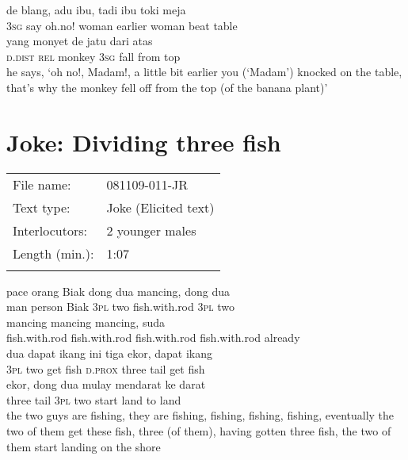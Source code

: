 \ea
\gll   de    {blang,}    {adu}    {ibu,}    {tadi}    {ibu}   toki   meja\\
  \textsc{3sg}    {say}    {oh.no!}    {woman}    {earlier}    {woman}   beat   table\\
    {yang}    {monyet}   de    {jatu}    {dari}    {atas}\\
   {\textsc{d.dist}}    {\textsc{rel}}    {monkey}   \textsc{3sg}    {fall}    {from}    {top}\\
\glt
he says, ‘oh no!, Madam!, a little bit earlier you (‘Madam’) knocked on the table, that’s why the monkey fell off from the top (of the banana plant)’
\z %

\section{Joke: Dividing three fish}
\label{Para_B.12}
\begin{tabular}{ll}
\lsptoprule
File name:  &  081109-011-JR\\
Text type:  & Joke (Elicited text)\\
Interlocutors: &  2 younger males\\
Length (min.): &  1:07\\
\lspbottomrule
\end{tabular}
\setcounter{equation}{0}
\ea
\gll   pace    {orang}    {Biak}    {dong}    {dua}    {mancing,}    {dong}    {dua}\\
  man    {person}    {Biak}    {\textsc{3pl}}    {two}    {fish.with.rod}    {\textsc{3pl}}    {two}\\
    {mancing}    {mancing}    {mancing,}    {suda}\\
   {fish.with.rod}    {fish.with.rod}    {fish.with.rod}    {fish.with.rod}    {already}\\
   dua    {dapat}    {ikang}    {ini}    {tiga}    {ekor,}    {dapat}   ikang\\
   {\textsc{3pl}}   two    {get}    {fish}    {\textsc{d.prox}}    {three}    {tail}    {get}   fish\\
    {ekor,}    {dong}    {dua}    {mulay}    {mendarat}    {ke}    {darat}\\
   {three}    {tail}    {\textsc{3pl}}    {two}    {start}    {land}    {to}    {land}\\
\glt
the two  guys are fishing, they are fishing, fishing, fishing, fishing, eventually the two of them get these fish, three (of them), having gotten three fish, the two of them start landing on the shore
\z

